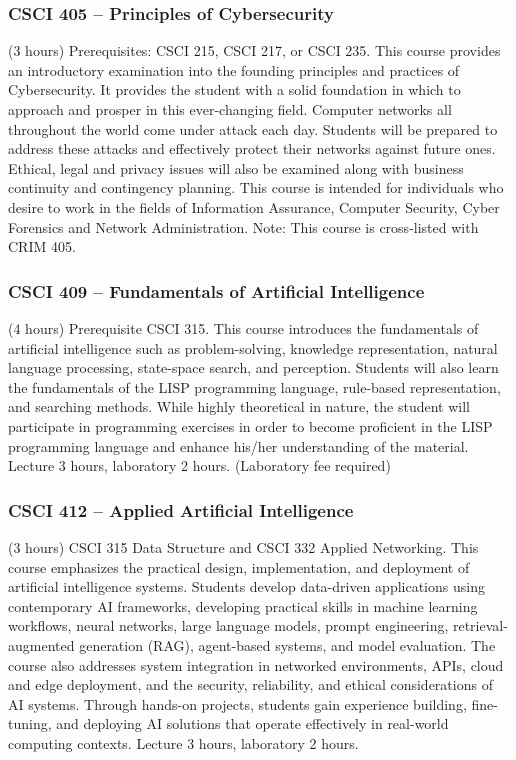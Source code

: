 \subsubsection{CSCI 405 -- Principles of Cybersecurity}%
\label{course:CSCI:405}
(3 hours) Prerequisites: CSCI 215, CSCI 217, or CSCI 235. This course provides an introductory examination into the founding principles and practices of Cybersecurity.  It provides the student with a solid foundation in which to approach and prosper in this ever-changing field.  Computer networks all throughout the world come under attack each day.  Students will be prepared to address these attacks and effectively protect their networks against future ones.  Ethical, legal and privacy issues will also be examined along with business continuity and contingency planning.  This course is intended for individuals who desire to work in the fields of Information Assurance, Computer Security, Cyber Forensics and Network Administration. Note: This course is cross-listed with CRIM 405.

\subsubsection{CSCI 409 -- Fundamentals of Artificial Intelligence}%
\label{course:CSCI:409}
(4 hours) Prerequisite CSCI 315. This course introduces the fundamentals of artificial intelligence such as problem-solving, knowledge representation, natural language processing, state-space search, and perception. Students will also learn the fundamentals of the LISP programming language, rule-based representation, and searching methods. While highly theoretical in nature, the student will participate in programming exercises in order to become proficient in the LISP programming language and enhance his/her understanding of the material. Lecture 3 hours, laboratory 2 hours. (Laboratory fee required)

\subsubsection{CSCI 412 -- Applied Artificial Intelligence}%
\label{course:CSCI:412}
(3 hours) CSCI 315 Data Structure and CSCI 332 Applied Networking. This course emphasizes the practical design, implementation, and deployment of artificial intelligence systems. Students develop data-driven applications using contemporary AI frameworks, developing practical skills in machine learning workflows, neural networks, large language models, prompt engineering, retrieval-augmented generation (RAG), agent-based systems, and model evaluation. The course also addresses system integration in networked environments, APIs, cloud and edge deployment, and the security, reliability, and ethical considerations of AI systems. Through hands-on projects, students gain experience building, fine-tuning, and deploying AI solutions that operate effectively in real-world computing contexts. Lecture 3 hours, laboratory 2 hours.

